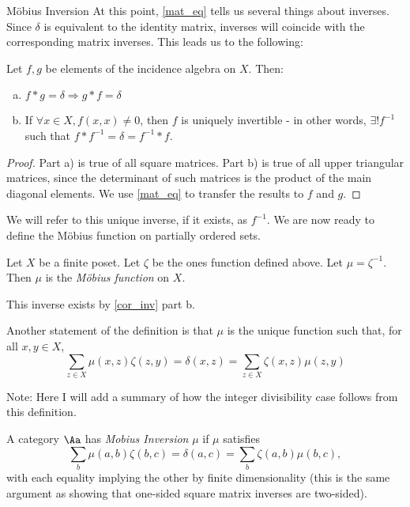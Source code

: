 \documentclass[12pt]{pom_thesis}
\begin{document}
\begin{chapter}{M\"obius Inversion}
At this point, \ref{mat_eq} tells us several things about inverses. Since $\delta$ is equivalent to the identity matrix, inverses will coincide with the corresponding matrix inverses. This leads us to the following:
\begin{cor}\label{cor_inv}
Let $f,g$ be elements of the incidence algebra on $X$. Then:
\begin{enumerate}[a)]
\item $f*g = \delta \Rightarrow g*f = \delta$
\item If $\forall x \in X, f(x,x) \neq 0$, then $f$ is uniquely invertible - in other words, $\exists! f^{-1}$ such that $f*f^{-1} = \delta = f^{-1} * f$.
\end{enumerate}
\end{cor}
\begin{proof}
Part a) is true of all square matrices. Part b) is true of all upper triangular matrices, since the determinant of such matrices is the product of the main diagonal elements. We use \ref{mat_eq} to transfer the results to $f$ and $g$.
\end{proof}
We will refer to this unique inverse, if it exists, as $f^{-1}$. We are now ready to define the M\"obius function on partially ordered sets.
\begin{defn}\label{def_mob_pos}
Let $X$ be a finite poset. Let $\zeta$ be the ones function defined above. Let $\mu = \zeta^{-1}$. Then $\mu$ is the \emph{M\"obius function} on $X$.
\end{defn}
\begin{rmk}
This inverse exists by \ref{cor_inv} part b. 
\end{rmk}
\begin{rmk}
Another statement of the definition is that $\mu$ is the unique function such that, for all $x,y \in X$,
\[
\sum_{z \in X} \mu(x,z)\zeta(z,y) = \delta(x,z) = \sum_{z \in X} \zeta(x,z)\mu(z,y)
\]
\end{rmk}
Note: Here I will add a summary of how the integer divisibility case follows from this definition.

\begin{defn}
A category $\Aa$ has \emph{Mobius Inversion} $\mu$ if $\mu$ satisfies
\[
\sum_b \mu(a,b)\zeta(b,c) = \delta(a,c) = \sum_b \zeta(a,b)\mu(b,c),
\]
with each equality implying the other by finite dimensionality (this is the same argument as showing that one-sided square matrix inverses are two-sided).
\end{defn}


\end{chapter}
\end{document}
